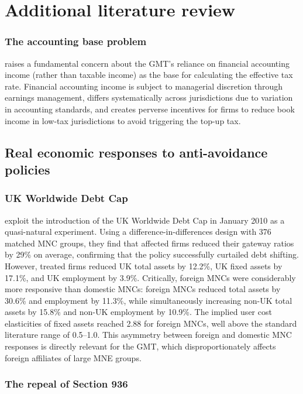 \documentclass[11pt,a4paper]{article}
\begin{document}
\section{Additional literature review}

\subsubsection{The accounting base problem}

\citet{hanlon2023} raises a fundamental concern about the GMT's reliance on financial accounting income (rather than taxable income) as the base for calculating the effective tax rate. Financial accounting income is subject to managerial discretion through earnings management, differs systematically across jurisdictions due to variation in accounting standards, and creates perverse incentives for firms to reduce book income in low-tax jurisdictions to avoid triggering the top-up tax.

\subsection{Real economic responses to anti-avoidance policies}\label{sec:real_responses}

\subsubsection{UK Worldwide Debt Cap}

\citet{bilicka2022} exploit the introduction of the UK Worldwide Debt Cap in January 2010 as a quasi-natural experiment. Using a difference-in-differences design with 376 matched MNC groups, they find that affected firms reduced their gateway ratios by 29\% on average, confirming that the policy successfully curtailed debt shifting. However, treated firms reduced UK total assets by 12.2\%, UK fixed assets by 17.1\%, and UK employment by 3.9\%. Critically, foreign MNCs were considerably more responsive than domestic MNCs: foreign MNCs reduced total assets by 30.6\% and employment by 11.3\%, while simultaneously increasing non-UK total assets by 15.8\% and non-UK employment by 10.9\%. The implied user cost elasticities of fixed assets reached 2.88 for foreign MNCs, well above the standard literature range of 0.5--1.0. This asymmetry between foreign and domestic MNC responses is directly relevant for the GMT, which disproportionately affects foreign affiliates of large MNE groups.

\subsubsection{The repeal of Section 936}
\end{document}
